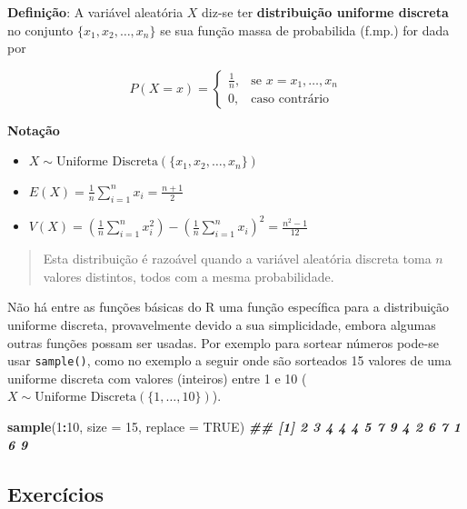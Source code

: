 \documentclass[
]{book}
\newenvironment{Shaded}{\begin{snugshade}}{\end{snugshade}}
\newcommand{\AttributeTok}[1]{\textcolor[rgb]{0.13,0.29,0.53}{#1}}
\newcommand{\ConstantTok}[1]{\textcolor[rgb]{0.56,0.35,0.01}{#1}}
\newcommand{\DecValTok}[1]{\textcolor[rgb]{0.00,0.00,0.81}{#1}}
\newcommand{\DocumentationTok}[1]{\textcolor[rgb]{0.56,0.35,0.01}{\textbf{\textit{#1}}}}
\newcommand{\FunctionTok}[1]{\textcolor[rgb]{0.13,0.29,0.53}{\textbf{#1}}}
\newcommand{\NormalTok}[1]{#1}
\newcommand{\SpecialCharTok}[1]{\textcolor[rgb]{0.81,0.36,0.00}{\textbf{#1}}}
\providecommand{\tightlist}{%
  \setlength{\itemsep}{0pt}\setlength{\parskip}{0pt}}
\begin{document}
\textbf{Definição}: A variável aleatória \(X\) diz-se ter \textbf{distribuição uniforme discreta} no conjunto \(\{x_1, x_2, \dots, x_n\}\) se sua função massa de probabilida (f.mp.) for dada por

\[
P(X = x) = 
\begin{cases}
\frac{1}{n}, & \text{se } x = x_1, \dots, x_n \\
0, & \text{caso contrário}
\end{cases}
\]

\textbf{Notação}

\begin{itemize}
\tightlist
\item
  \(X \sim \text{Uniforme Discreta} (\{x_1, x_2, \dots, x_n\})\)
\item
  \(E(X) = \frac{1}{n} \sum_{i=1}^{n} x_i = \frac{n+1}{2}\)
\item
  \(V(X) = \left(\frac{1}{n} \sum_{i=1}^{n} x_i^2\right) - \left(\frac{1}{n} \sum_{i=1}^{n} x_i \right)^2 = \frac{n^2 - 1}{12}\)
\end{itemize}

\begin{quote}
Esta distribuição é razoável quando a variável aleatória discreta toma \(n\) valores distintos, todos com a mesma probabilidade.
\end{quote}

Não há entre as funções básicas do R uma função específica para a distribuição uniforme discreta, provavelmente devido a sua simplicidade, embora algumas outras funções possam ser usadas. Por exemplo para sortear números pode-se usar \texttt{sample()}, como no exemplo a seguir onde são sorteados 15 valores de uma uniforme discreta com valores (inteiros) entre 1 e 10 (\(X\sim \text{Uniforme Discreta}(\{1,\ldots,10\})\)).

\begin{Shaded}
\begin{Highlighting}[]
\FunctionTok{sample}\NormalTok{(}\DecValTok{1}\SpecialCharTok{:}\DecValTok{10}\NormalTok{, }\AttributeTok{size =} \DecValTok{15}\NormalTok{, }\AttributeTok{replace =} \ConstantTok{TRUE}\NormalTok{)}
\DocumentationTok{\#\# [1] 2 3 4 4 4 5 7 9 4 2 6 7 1 6 9}
\end{Highlighting}
\end{Shaded}

\subsection{Exercícios}\label{exercuxedcios-23}
\end{document}
